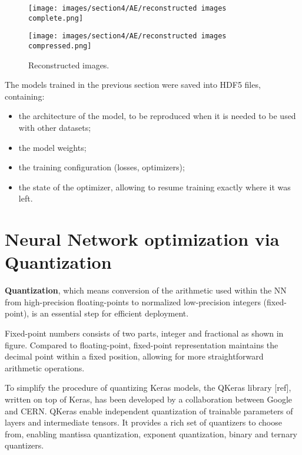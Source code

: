 \documentclass{article}
\begin{document}
\begin{figure}[H]
  \centering
  \begin{minipage}[c]{.4\textwidth}
   {\texttt{[image: images/section4/AE/reconstructed images complete.png]}}
    \end{minipage}
    \qquad \qquad
      \begin{minipage}[c]{0.4\textwidth}
  {\texttt{[image: images/section4/AE/reconstructed images compressed.png]}}
     \end{minipage}
     \quad   
   \caption{Reconstructed images.}
    \label{fig:reco}
\end{figure}

\par The models trained in the previous section were saved into HDF5 files, containing:
\begin{itemize}
  \item the architecture of the model, to be reproduced when it is needed to be used with other datasets;
  \item the model weights;
  \item the training configuration (losses, optimizers);
  \item the state of the optimizer, allowing to resume training exactly where it was left.
\end{itemize}


\section{Neural Network optimization via Quantization}

\textbf{Quantization}, which means conversion of the arithmetic used within the NN from high-precision floating-points 
to normalized low-precision integers (fixed-point), is an essential step for efficient deployment.
\par Fixed-point numbers consists of two parts, integer and fractional as shown in figure.
Compared to floating-point, fixed-point representation maintains
the decimal point within a fixed position, allowing for more straightforward
arithmetic operations.
\par To simplify the procedure of quantizing Keras models, the QKeras library [ref], written on top of Keras,
has been developed by a collaboration between Google and CERN.
QKeras enable independent quantization of trainable parameters of layers and intermediate tensors.
It provides a rich set of quantizers to choose from, enabling mantissa quantization, exponent quantization, binary and ternary quantizers. 
\end{document}
